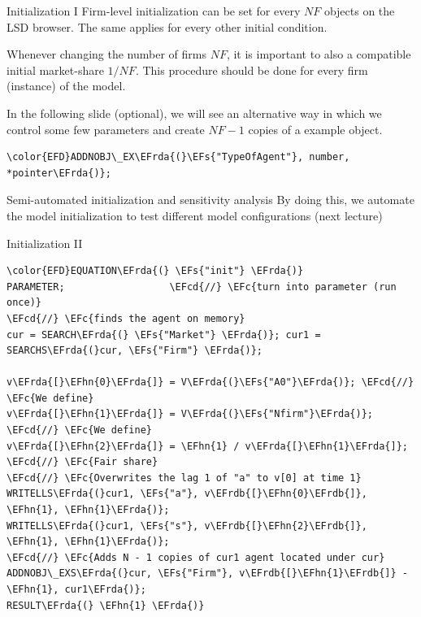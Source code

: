 \documentclass[bigger,aspectratio=169]{beamer}
\newcommand{\EFc}[1]{\textcolor{EFc}{#1}} %
\newcommand{\EFcd}[1]{\textcolor{EFcd}{#1}} %
\newcommand{\EFs}[1]{\textcolor{EFs}{#1}} %
\newcommand{\EFhn}[1]{\textcolor{EFhn}{\textbf{#1}}} %
\newcommand{\EFrda}[1]{\textcolor{EFrda}{#1}} %
\newcommand{\EFrdb}[1]{\textcolor{EFrdb}{#1}} %
\begin{document}
\begin{frame}[label={sec:org89ac9d5},fragile]{Initialization I}
 Firm-level initialization can be set for every \(NF\) objects on the LSD browser.
The same applies for every other initial condition.

Whenever changing the number of firms \(NF\), it is important to also a compatible initial market-share \(1/NF\).
This procedure should be done for every firm (instance) of the model.

In the following slide (optional), we will see an alternative way in which we control some few parameters and create \(NF-1\) copies of a example object.

\begin{Code}
\begin{Verbatim}
\color{EFD}ADDNOBJ\_EX\EFrda{(}\EFs{"TypeOfAgent"}, number, *pointer\EFrda{)};
\end{Verbatim}
\end{Code}
\begin{block}{Semi-automated initialization and sensitivity analysis}
By doing this, we automate the model initialization to test different model configurations (next lecture)
\end{block}
\end{frame}
\begin{frame}[label={sec:orgacefb46},fragile]{Initialization II}
 \begin{Code}
\begin{Verbatim}
\color{EFD}EQUATION\EFrda{(} \EFs{"init"} \EFrda{)}
PARAMETER;                  \EFcd{//} \EFc{turn into parameter (run once)}
\EFcd{//} \EFc{finds the agent on memory}
cur = SEARCH\EFrda{(} \EFs{"Market"} \EFrda{)}; cur1 = SEARCHS\EFrda{(}cur, \EFs{"Firm"} \EFrda{)};

v\EFrda{[}\EFhn{0}\EFrda{]} = V\EFrda{(}\EFs{"A0"}\EFrda{)}; \EFcd{//} \EFc{We define}
v\EFrda{[}\EFhn{1}\EFrda{]} = V\EFrda{(}\EFs{"Nfirm"}\EFrda{)}; \EFcd{//} \EFc{We define}
v\EFrda{[}\EFhn{2}\EFrda{]} = \EFhn{1} / v\EFrda{[}\EFhn{1}\EFrda{]}; \EFcd{//} \EFc{Fair share}
\EFcd{//} \EFc{Overwrites the lag 1 of "a" to v[0] at time 1}
WRITELLS\EFrda{(}cur1, \EFs{"a"}, v\EFrdb{[}\EFhn{0}\EFrdb{]}, \EFhn{1}, \EFhn{1}\EFrda{)};
WRITELLS\EFrda{(}cur1, \EFs{"s"}, v\EFrdb{[}\EFhn{2}\EFrdb{]}, \EFhn{1}, \EFhn{1}\EFrda{)};
\EFcd{//} \EFc{Adds N - 1 copies of cur1 agent located under cur}
ADDNOBJ\_EXS\EFrda{(}cur, \EFs{"Firm"}, v\EFrdb{[}\EFhn{1}\EFrdb{]} - \EFhn{1}, cur1\EFrda{)};
RESULT\EFrda{(} \EFhn{1} \EFrda{)}
\end{Verbatim}
\end{Code}
\end{frame}
\end{document}
